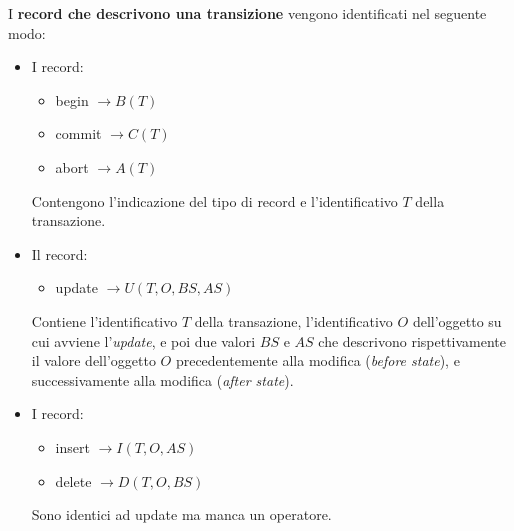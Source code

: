 \documentclass[a4paper]{article}
\begin{document}
	I \textbf{record che descrivono una transizione} vengono identificati nel seguente modo:
	\begin{itemize}
		\item I record:
		\begin{itemize}
			\item \textsf{begin} $\longrightarrow B\left(T\right)$
			\item \textsf{commit} $\longrightarrow C\left(T\right)$
			\item \textsf{abort} $\longrightarrow A\left(T\right)$
		\end{itemize}
		Contengono l'indicazione del tipo di record e l'identificativo $T$ della transazione.
		
		\item Il record:
		\begin{itemize}
			\item \textsf{update} $\longrightarrow U\left(T, O, BS, AS\right)$
		\end{itemize}
		Contiene l'identificativo $T$ della transazione, l'identificativo $O$ dell'oggetto su cui avviene l'\emph{update}, e poi due valori $BS$ e $AS$ che descrivono rispettivamente il valore dell'oggetto $O$ precedentemente alla modifica (\emph{before state}), e successivamente alla modifica (\emph{after state}).
		
		\item I record:
		\begin{itemize}
			\item \textsf{insert} $\longrightarrow I\left(T, O, AS\right)$
			\item \textsf{delete} $\longrightarrow D\left(T, O, BS\right)$
		\end{itemize}
		Sono identici ad \textsf{update} ma manca un operatore.
	\end{itemize}
\end{document}
